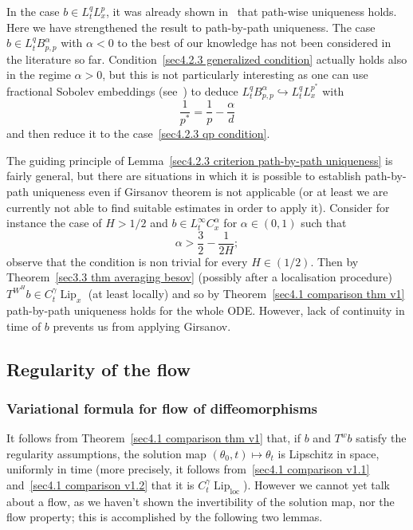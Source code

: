\documentclass[10pt]{article}
\newcommand{\tmop}[1]{\ensuremath{\operatorname{#1}}}
\begin{document}
In the case $b \in L^q_t L^p_x$, it was already shown in~{\cite{le}} that
path-wise uniqueness holds. Here we have strengthened the result to
path\mbox{-}by\mbox{-}path uniqueness. The case $b \in L^q_t B^{\alpha}_{p,
p}$ with $\alpha < 0$ to the best of our knowledge has not been considered in
the literature so far. Condition~{\eqref{sec4.2.3 generalized condition}}
actually holds also in the regime $\alpha > 0$, but this is not particularly
interesting as one can use fractional Sobolev embeddings
(see~{\cite{dinezza}}) to deduce $L^q_t B^{\alpha}_{p, p} \hookrightarrow
L^q_t L^{p^{\ast}}_x$ with
\[ \frac{1}{p^{\ast}} = \frac{1}{p} - \frac{\alpha}{d} \]
and then reduce it to the case~{\eqref{sec4.2.3 qp condition}}.

\begin{remark}
  The guiding principle of Lemma~\ref{sec4.2.3 criterion path-by-path
  uniqueness} is fairly general, but there are situations in which it is
  possible to establish path\mbox{-}by\mbox{-}path uniqueness even if Girsanov
  theorem is not applicable (or at least we are currently not able to find
  suitable estimates in order to apply it). Consider for instance the case of
  $H > 1 / 2$ and $b \in L^{\infty}_t C^{\alpha}_x$ for $\alpha \in (0, 1)$
  such that
  \[ \alpha > \frac{3}{2} - \frac{1}{2 H} ; \]
  observe that the condition is non trivial for every $H \in (1 / 2)$. Then by
  Theorem~\ref{sec3.3 thm averaging besov} (possibly after a localisation
  procedure) $T^{W^H} b \in C^{\gamma}_t \tmop{Lip}_x$ (at least locally) and
  so by Theorem~\ref{sec4.1 comparison thm v1} path\mbox{-}by\mbox{-}path
  uniqueness holds for the whole ODE. However, lack of continuity in time of
  $b$ prevents us from applying Girsanov.
\end{remark}

\subsection{Regularity of the flow}\label{sec4.3}

\subsubsection{Variational formula for flow of
diffeomorphisms}\label{sec4.3.1}\label{sec4.3.1}

It follows from Theorem~\ref{sec4.1 comparison thm v1} that, if $b$ and $T^w
b$ satisfy the regularity assumptions, the solution map $(\theta_0, t) \mapsto
\theta_t$ is Lipschitz in space, uniformly in time (more precisely, it follows
from~{\eqref{sec4.1 comparison v1.1}} and~{\eqref{sec4.1 comparison v1.2}}
that it is $C^{\gamma}_t \tmop{Lip}_{\tmop{loc}}$). However we cannot yet talk
about a flow, as we haven't shown the invertibility of the solution map, nor
the flow property; this is accomplished by the following two lemmas.
\end{document}
